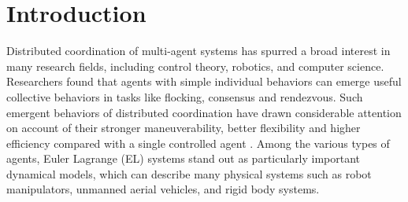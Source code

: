 \section{Introduction}
\label{sec:introduction}


Distributed coordination of multi-agent systems has spurred a broad interest in many research fields, including control theory, robotics, and computer science.
Researchers found that agents with simple individual behaviors can emerge useful collective behaviors in tasks like flocking, consensus and rendezvous. 
Such emergent behaviors of distributed coordination have drawn considerable attention on account of their stronger maneuverability, better flexibility and higher efficiency compared with a single controlled agent \cite{olfati-saberConsensusProblemsNetworks2004}.
Among the various types of agents, Euler Lagrange (EL) systems stand out as particularly important dynamical models, which can describe many physical systems such as robot manipulators, unmanned aerial vehicles, and rigid body systems.


